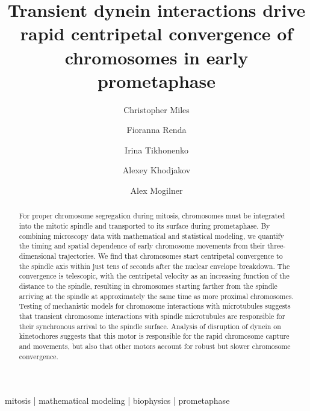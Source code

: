\documentclass[times, twoside,onecolumn]{zHenriquesLab-StyleBioRxiv}
\begin{document}
\title{Transient dynein interactions drive rapid centripetal convergence of chromosomes in early prometaphase}

\author[1,\,\Letter]{Christopher Miles}

\author[2]{Fioranna Renda}
\author[2]{Irina Tikhonenko}
\author[2]{Alexey Khodjakov}
\author[3]{Alex Mogilner} 



\maketitle

\begin{abstract}
For proper chromosome segregation during mitosis, chromosomes must be integrated into the mitotic spindle and transported to its surface during prometaphase. By combining microscopy data with mathematical and statistical modeling, we quantify the timing and spatial dependence of early chromosome movements from their three-dimensional trajectories. We find that chromosomes start centripetal convergence to the spindle axis within just tens of seconds after the nuclear envelope breakdown. The convergence is telescopic, with the centripetal velocity as an increasing function of the distance to the spindle, resulting in chromosomes starting farther from the spindle arriving at the spindle at approximately the same time as more proximal chromosomes. Testing of mechanistic models for chromosome interactions with microtubules suggests that transient chromosome interactions with spindle microtubules are responsible for their synchronous arrival to the spindle surface. Analysis of disruption of dynein  on kinetochores suggests that this motor is responsible for the rapid chromosome capture and movements, but also that other motors account for robust but slower chromosome convergence. 
\end{abstract}

\begin{keywords}
mitosis | mathematical modeling | biophysics | prometaphase
\end{keywords}
\end{document}
